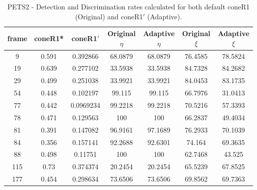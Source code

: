 \begin{appendices}
\begin{table}
\end{table}
\begin{table}
\centering
\caption{PETS2 - Detection and Discrimination rates calculated for both default coneR1 (Original) and coneR1$'$ (Adaptive).}
\begin{tabular}{ |c|c|c|c|c|c|c| }
\hline
\textbf{frame} &  \textbf{coneR1*} &  \textbf{coneR1$'$} &  \textbf{Original $\eta$} &  \textbf{Adaptive $\eta$} &  \textbf{Original $\xi$} &  \textbf{Adaptive $\xi$} \\
\hline
\hline
9 &  0.591 &  0.392866 &  68.0879 &  68.0879 &  76.4585 &  78.5824 \\
\hline
19 &  0.639 &  0.277102 &  33.5938 &  33.5938 &  84.7328 &  84.2682 \\
\hline
29 &  0.499 &  0.251038 &  33.9921 &  33.9921 &  84.0453 &  83.1735 \\
\hline
54 &  0.448 &  0.102197 &  99.115 &  99.115 &  66.7976 &  31.0413 \\
\hline
77 &  0.442 &  0.0969234 &  99.2218 &  99.2218 &  70.5216 &  57.3393 \\
\hline
78 &  0.471 &  0.129563 &  100 &  100 &  66.2837 &  49.4034 \\
\hline
81 &  0.391 &  0.147082 &  96.9161 &  97.1689 &  76.2933 &  70.1039 \\
\hline
84 &  0.356 &  0.157141 &  92.2688 &  92.6301 &  74.164 &  69.3635 \\
\hline
88 &  0.498 &  0.11751 &  100 &  100 &  62.7468 &  43.525 \\
\hline
115 &  0.73 &  0.374374 &  20.2454 &  20.2454 &  65.5239 &  67.8525 \\
\hline
177 &  0.454 &  0.298634 &  73.6506 &  73.6506 &  69.8562 &  69.7363 \\

\hline
\end{tabular}

\end{table}


\end{appendices}

